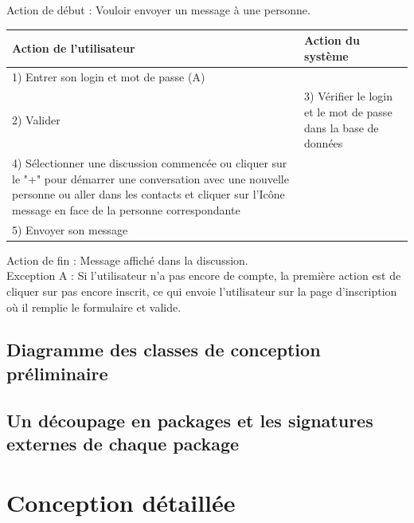\documentclass[a4paper,12pt]{article}
\begin{document}
Action de début : Vouloir envoyer un message à une personne. \\

\begin{tabular}{|p{8cm}|p{8cm}|}
\hline 
Action de l'utilisateur & Action du système\tabularnewline
\hline 
\hline 
1) Entrer son login et mot de passe (A)  & \tabularnewline
\hline 
2) Valider  & 3) Vérifier le login et le mot de passe dans la base de données\tabularnewline
\hline 
4) Sélectionner une discussion commencée ou cliquer sur le "+" pour
démarrer une conversation avec une nouvelle personne ou aller dans les contacts et cliquer sur l’Icône message en face de la personne correspondante & \tabularnewline
\hline 
5) Envoyer son message  & \tabularnewline
\hline 
\end{tabular}

Action de fin  : Message affiché dans la discussion. \\

Exception A : Si l'utilisateur n'a pas encore de compte, la première action est de cliquer sur pas encore inscrit, ce qui envoie l'utilisateur sur la page d'inscription où il remplie le formulaire et valide. 



\subsection{Diagramme des classes de conception préliminaire}

\subsection{Un découpage en packages et les signatures externes de chaque package}

\section{Conception détaillée}










\end{document}
